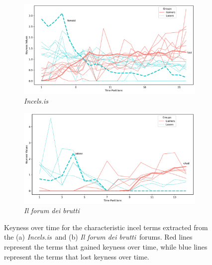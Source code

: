 \documentclass[11pt]{article}
\newcommand{\enforum}{\textit{Incels.is}}
\newcommand{\itforum}{\textit{Il forum dei brutti}}
\begin{document}
\begin{figure}[]
  \centering
  \begin{subfigure}[b]{\textwidth}
    \includegraphics[width=\textwidth]{images-tables/keyness_chart_incelsis.pdf}
    \caption{\enforum}
  \end{subfigure}
  \begin{subfigure}[b]{\textwidth}
    \includegraphics[width=\textwidth]{images-tables/keyness_chart_fdb.pdf}
    \caption{\itforum}
  \end{subfigure}
  \caption[Keyness graph for \enforum\, and \itforum.]{Keyness over time for the characteristic incel terms extracted from the (a) \enforum\, and (b) \itforum\, forums. Red lines represent the terms that gained keyness over time, while blue lines represent the terms that lost keyness over time.}
  \label{fig:keyness-over-time}
\end{figure}
\end{document}
